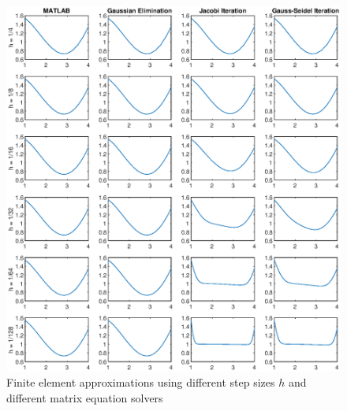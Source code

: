 \documentclass{homework}
\begin{document}
	\begin{figure}[h]
		\centering
		\includegraphics{plots.eps}
		\caption{Finite element approximations using different step sizes $h$ and different matrix equation solvers}
		\label{fig:plots}
	\end{figure}
	
\end{document}
